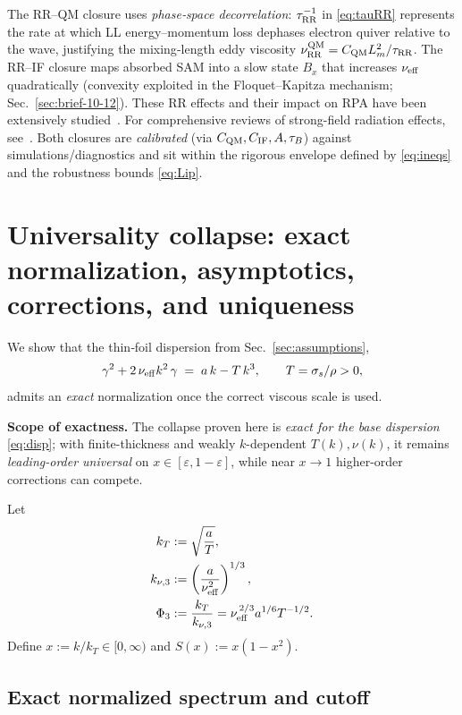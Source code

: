 \documentclass[aps,pre,twocolumn,showpacs,superscriptaddress]{revtex4-2}
\theoremstyle{definition}
\begin{document}
The RR–QM closure uses \emph{phase‑space decorrelation}: $\tau_{\rm RR}^{-1}$ in \eqref{eq:tauRR} represents the rate at which LL energy–momentum loss dephases electron quiver relative to the wave, justifying the mixing‑length eddy viscosity $\nu^{\rm QM}_{\rm RR}=C_{\rm QM} L_m^2/\tau_{\rm RR}$. The RR–IF closure maps absorbed SAM into a slow state $B_x$ that increases $\nu_{\rm eff}$ quadratically (convexity exploited in the Floquet–Kapitza mechanism; Sec.~\ref{sec:brief-10-12}). These RR effects and their impact on RPA have been extensively studied~\cite{Tamburini2010NJP_RR_RPA,Tamburini2012PRE_RPD}. For comprehensive reviews of strong-field radiation effects, see~\cite{DiPiazza2012RMP,Gonoskov2022RMP}. Both closures are \emph{calibrated} (via $C_{\rm QM},C_{\rm IF},A,\tau_B$) against simulations/diagnostics and sit within the rigorous envelope defined by \eqref{eq:ineqs} and the robustness bounds \eqref{eq:Lip}.

\section{Universality collapse: exact normalization, asymptotics, corrections, and uniqueness}\label{sec:collapse}

We show that the thin‑foil dispersion from Sec.~\ref{sec:assumptions},
\begin{equation}\label{eq:disp-again}
\gamma^2 + 2\,\nu_{\rm eff} k^2\,\gamma \;=\; a\,k - T\,k^3,\qquad T=\sigma_s/\rho>0,
\end{equation}
admits an \emph{exact} normalization once the correct viscous scale is used. 

\noindent\textbf{Scope of exactness.} The collapse proven here is \emph{exact for the base dispersion} \eqref{eq:disp};
with finite-thickness and weakly $k$-dependent $T(k),\nu(k)$, it remains \emph{leading-order universal} on
$x\in[\varepsilon,1-\varepsilon]$, while near $x\!\to\!1$ higher-order corrections can compete.

Let
\begin{align}\label{eq:knu3}
k_T&:=\sqrt{\frac{a}{T}},\\
k_{\nu,3}&:=\left(\frac{a}{\nu_{\rm eff}^2}\right)^{1/3},\nonumber\\
\Phi_3&:=\frac{k_T}{k_{\nu,3}}=\nu_{\rm eff}^{\,2/3} a^{1/6} T^{-1/2}.\nonumber
\end{align}
Define $x:=k/k_T\in[0,\infty)$ and $S(x):=x(1-x^2)$.

\subsection{Exact normalized spectrum and cutoff}\label{subsec:exact-spectrum}
\end{document}
